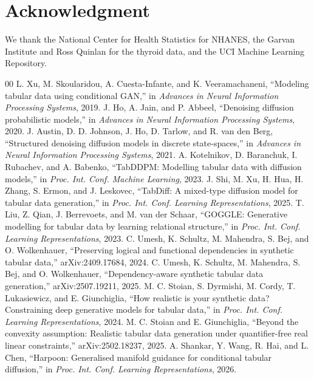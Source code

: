 \documentclass[conference]{IEEEtran}
\begin{document}
\section*{Acknowledgment}

We thank the National Center for Health Statistics for NHANES, the Garvan Institute and Ross Quinlan for the thyroid data, and the UCI Machine Learning Repository.

\begin{thebibliography}{00}
 L. Xu, M. Skoularidou, A. Cuesta-Infante, and K. Veeramachaneni, ``Modeling tabular data using conditional GAN,'' in \textit{Advances in Neural Information Processing Systems}, 2019.
 J. Ho, A. Jain, and P. Abbeel, ``Denoising diffusion probabilistic models,'' in \textit{Advances in Neural Information Processing Systems}, 2020.
 J. Austin, D. D. Johnson, J. Ho, D. Tarlow, and R. van den Berg, ``Structured denoising diffusion models in discrete state-spaces,'' in \textit{Advances in Neural Information Processing Systems}, 2021.
 A. Kotelnikov, D. Baranchuk, I. Rubachev, and A. Babenko, ``TabDDPM: Modelling tabular data with diffusion models,'' in \textit{Proc. Int. Conf. Machine Learning}, 2023.
 J. Shi, M. Xu, H. Hua, H. Zhang, S. Ermon, and J. Leskovec, ``TabDiff: A mixed-type diffusion model for tabular data generation,'' in \textit{Proc. Int. Conf. Learning Representations}, 2025.
 T. Liu, Z. Qian, J. Berrevoets, and M. van der Schaar, ``GOGGLE: Generative modelling for tabular data by learning relational structure,'' in \textit{Proc. Int. Conf. Learning Representations}, 2023.
 C. Umesh, K. Schultz, M. Mahendra, S. Bej, and O. Wolkenhauer, ``Preserving logical and functional dependencies in synthetic tabular data,'' arXiv:2409.17684, 2024.
 C. Umesh, K. Schultz, M. Mahendra, S. Bej, and O. Wolkenhauer, ``Dependency-aware synthetic tabular data generation,'' arXiv:2507.19211, 2025.
 M. C. Stoian, S. Dyrmishi, M. Cordy, T. Lukasiewicz, and E. Giunchiglia, ``How realistic is your synthetic data? Constraining deep generative models for tabular data,'' in \textit{Proc. Int. Conf. Learning Representations}, 2024.
 M. C. Stoian and E. Giunchiglia, ``Beyond the convexity assumption: Realistic tabular data generation under quantifier-free real linear constraints,'' arXiv:2502.18237, 2025.
 A. Shankar, Y. Wang, R. Hai, and L. Chen, ``Harpoon: Generalised manifold guidance for conditional tabular diffusion,'' in \textit{Proc. Int. Conf. Learning Representations}, 2026.

\end{thebibliography}
\end{document}
